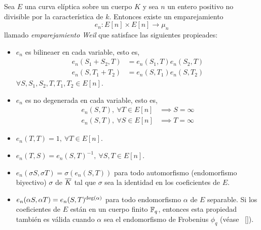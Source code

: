 \begin{proposicion}
	Sea $E$ una curva elíptica sobre un cuerpo $K$ y sea $n$ un entero positivo no divisible por la característica de $k$. Entonces existe un emparejamiento
	$$
		e_n : E[n] \times E[n] \to \mu_n
	$$
	llamado \emph{emparejamiento Weil} que satisface las siguientes propieades:
	\begin{itemize}
		\item $e_n$ es bilineaer en cada variable, esto es,
			\begin{align*}
				e_n(S_1 + S_2, T) &= e_n(S_1, T) e_n(S_2, T) \\
				e_n(S, T_1 + T_2) &= e_n(S, T_1) e_n(S, T_2)
			\end{align*}
		$\forall S, S_1, S_2, T, T_1, T_2 \in E[n]$.

		\item $e_n$ es no degenerada en cada variable, esto es,
			\begin{align*}
				e_n(S, T), \ \forall T \in E[n] &\implies S = \infty \\
				e_n(S, T), \ \forall S \in E[n] &\implies T = \infty
			\end{align*}

		\item $e_n(T, T) = 1, \ \forall T \in E[n]$.

		\item $e_n(T, S) = e_n(S, T)^{-1}, \ \forall S, T \in E[n]$.

		\item $e_n(\sigma S, \sigma T) = \sigma(e_n(S, T))$ para todo automorfismo (endomorfismo biyectivo) $\sigma$ de $\overline{K}$ tal que $\sigma$ sea la identidad en los coeficientes de $E$.

		\item $e_n(\alpha S, \alpha T) = e_n(S, T)^{\deg(\alpha)}$ para todo endomorfismo $\alpha$ de $E$ separable. Si los coeficientes de $E$ están en un cuerpo finito $\mathbb{F}_q$, entonces esta propiedad también es válida cuando $\alpha$ sea el endomorfismo de Frobenius $\phi_q$ (véase ~\ref{}).
	\end{itemize}
\end{proposicion}
